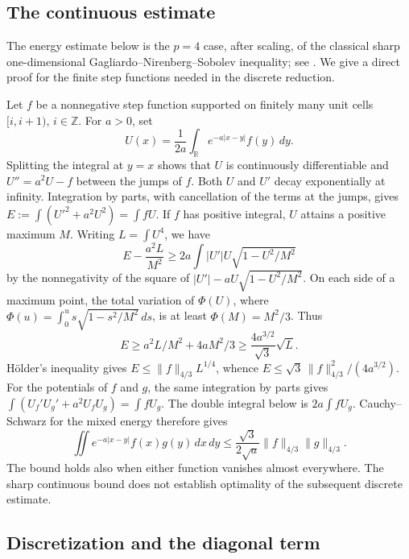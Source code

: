 \documentclass[11pt,a4paper]{article}
\begin{document}
\subsection{The continuous estimate}

The energy estimate below is the \(p=4\) case, after scaling, of the
classical sharp one-dimensional Gagliardo--Nirenberg--Sobolev inequality;
see \cite[(1.7)--(1.9)]{DELL}. We give a direct proof for the finite step
functions needed in the discrete reduction.

Let \(f\) be a nonnegative step function supported on finitely many
unit cells \([i,i+1)\), \(i\in\mathbb Z\). For \(a>0\), set
\[
 U(x)=\frac1{2a}\int_{\mathbb R}e^{-a|x-y|}f(y)\,dy .
\]
Splitting the integral at \(y=x\) shows that \(U\) is continuously
differentiable and \(U''=a^2U-f\) between the jumps of \(f\).
Both \(U\) and \(U'\) decay exponentially at infinity. Integration
by parts, with cancellation of the terms at the jumps, gives
\(E:=\int(U'^2+a^2U^2)=\int fU\).
If \(f\) has positive integral, \(U\) attains a positive maximum \(M\).
Writing \(L=\int U^4\), we have
\[
 E-\frac{a^2L}{M^2}\ge 2a\int |U'|U\sqrt{1-U^2/M^2}
\]
by the nonnegativity of the square of
\(|U'|-aU\sqrt{1-U^2/M^2}\).
On each side of a maximum point, the total variation of
\(\Phi(U)\), where \(\Phi(u)=\int_0^u s\sqrt{1-s^2/M^2}\,ds\),
is at least \(\Phi(M)=M^2/3\). Thus
\[
 E\ge a^2L/M^2+4aM^2/3\ge \frac{4a^{3/2}}{\sqrt3}\sqrt L.
\]
H\"older's inequality gives \(E\le\|f\|_{4/3}L^{1/4}\), whence
\(E\le\sqrt3\,\|f\|_{4/3}^2/(4a^{3/2})\).
For the potentials of \(f\) and \(g\), the same integration by parts gives
\(\int(U_f'U_g'+a^2U_fU_g)=\int fU_g\).
The double integral below is \(2a\int fU_g\). Cauchy--Schwarz for the
mixed energy therefore gives
\[
 \iint e^{-a|x-y|}f(x)g(y)\,dx\,dy
 \le \frac{\sqrt3}{2\sqrt a}\|f\|_{4/3}\|g\|_{4/3}.
\]
The bound holds also when either function vanishes almost everywhere.
The sharp continuous bound does not establish optimality of the
subsequent discrete estimate.

\subsection{Discretization and the diagonal term}
\end{document}
